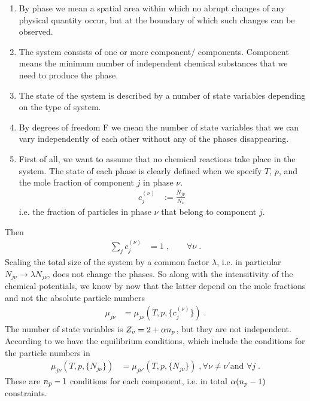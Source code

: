 \begin{enumerate}
	\item By phase we mean a spatial area within which no abrupt changes of any physical quantity occur,
but at the boundary of which such changes can be observed. 
\item The system consists of one or more component/ components. Component means the minimum number
of independent chemical substances that we need to produce the phase.
\item The state of the system is described by a number of state variables depending on the type of system. 
\item By degrees of freedom F we mean the number of state variables that we can vary independently of 
each other without any of the phases disappearing. 


\item First of all, we want to assume that no chemical reactions take place in the system. 
The state of each phase is clearly defined when we specify $T$, $p$, and the mole fraction of component $j$ in phase $\nu$.
%
\begin{align}\label{eq:}
c^{(\nu)}_{j} &:= \frac{N_{j\nu}}{N_{\nu}}\,
\end{align}
%
i.e. the fraction of particles in phase $\nu$ that belong to component $j$.
\end{enumerate}
%
 Then
%
\begin{align}\label{eq:mole:fraction:normalization}
\sum_{j} c^{(\nu)}_{j} &= 1\;,\qquad \forall \nu\;.
\end{align}
% 
Scaling the total size of the system by a common factor $\lambda$, i.e. in particular $N_{j\nu}\to \lambda N_{j\nu}$, does not change the phases. So along with the intensitivity of the chemical potentials, we know by now that the latter depend on the mole fractions and not the absolute particle numbers
%
\begin{align}\label{eq:mu:molefraction}
\mu_{j\nu} &=\mu_{j\nu}(T,p,\{c^{(\nu)}_{j}\})\;.
\end{align}
%
The number of state variables is $Z_{v}=2 + \alpha n_{p} $, but they are not independent.
%
According to  we have the equilibrium conditions, which 
include the conditions for the particle numbers in 
%
\begin{align*}
\mu_{j\nu}(T,p,\{N_{j\nu}\}) &= \mu_{j\nu'}(T,p,\{N_{j\nu}\})\;, \forall \nu\ne \nu'
\text{and } \forall j\;. 
\end{align*}
%
These are $n_{p} -1$ conditions for each component, i.e. in total $\alpha(n_{p} -1)$ constraints.
